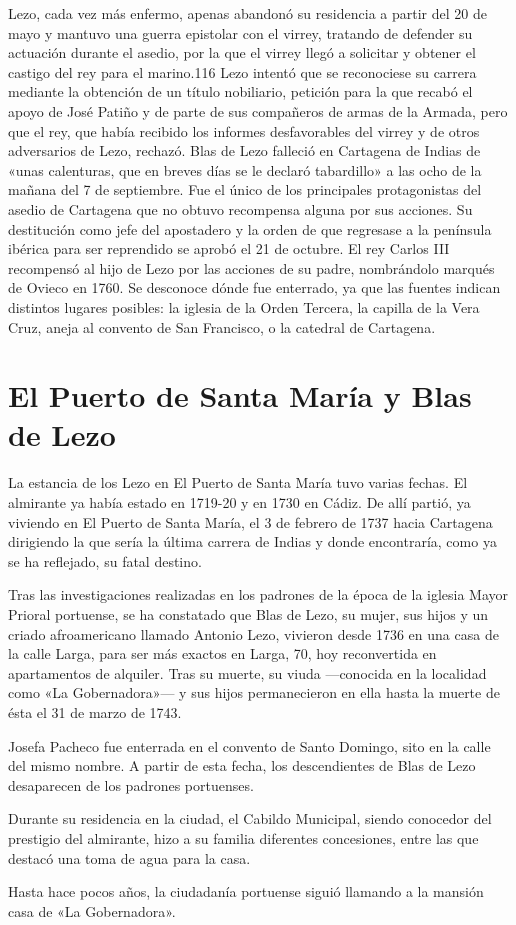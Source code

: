 Lezo, cada vez más enfermo, apenas abandonó su residencia a partir del
20 de mayo y mantuvo una guerra epistolar con el virrey, tratando de
defender su actuación durante el asedio, por la que el virrey llegó a
solicitar y obtener el castigo del rey para el marino.116 Lezo intentó
que se reconociese su carrera mediante la obtención de un título
nobiliario, petición para la que recabó el apoyo de José Patiño y de
parte de sus compañeros de armas de la Armada, pero que
el rey, que había recibido los informes desfavorables del virrey y de
otros adversarios de Lezo, rechazó. Blas de Lezo 
falleció en Cartagena de Indias  de «unas
calenturas, que en breves días se le declaró tabardillo» a las ocho de
la mañana del 7 de septiembre. Fue el único de los principales
protagonistas del asedio de Cartagena que no obtuvo recompensa alguna
por sus acciones. Su destitución como jefe del apostadero y la orden
de que regresase a la península ibérica para ser reprendido se aprobó
el 21 de octubre. El rey Carlos III recompensó al hijo de Lezo por las
acciones de su padre, nombrándolo marqués de Ovieco en 1760. Se
desconoce dónde fue enterrado, ya que las fuentes indican distintos
lugares posibles: la iglesia de la Orden Tercera, la capilla de la
Vera Cruz, aneja al convento de San Francisco, o la catedral de
Cartagena.

\section{El Puerto de Santa María y Blas de Lezo}

La estancia de los Lezo en El Puerto de Santa María tuvo varias
fechas. El almirante ya había estado en 1719-20 y en 1730 en Cádiz. De
allí partió, ya viviendo en El Puerto de Santa María, el 3 de febrero
de 1737 hacia Cartagena dirigiendo la que sería la última carrera de
Indias y donde encontraría, como ya se ha reflejado, su fatal destino.

Tras las investigaciones realizadas en los padrones de la época de la
iglesia Mayor Prioral portuense, se ha constatado que Blas de Lezo, su
mujer, sus hijos y un criado afroamericano llamado Antonio Lezo,
vivieron desde 1736 en una casa de la calle Larga, para ser más
exactos en Larga, 70, hoy reconvertida en apartamentos de
alquiler. Tras su muerte, su viuda ---conocida en la localidad como «La
Gobernadora»--- y sus hijos permanecieron en ella hasta la muerte de
ésta el 31 de marzo de 1743.

Josefa Pacheco fue enterrada en el convento de Santo Domingo, sito en
la calle del mismo nombre. A partir de esta fecha, los descendientes
de Blas de Lezo desaparecen de los padrones portuenses.

Durante su residencia en la ciudad, el Cabildo Municipal, siendo
conocedor del prestigio del almirante, hizo a su familia diferentes
concesiones, entre las que destacó una toma de agua para la casa.

Hasta hace pocos años, la ciudadanía portuense siguió llamando a la
mansión casa de «La Gobernadora».